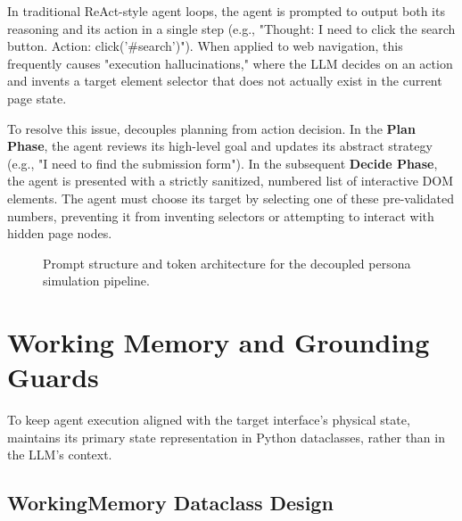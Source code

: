 In traditional ReAct-style agent loops, the agent is prompted to output both its reasoning and its action in a single step (e.g., "Thought: I need to click the search button. Action: click('#search')"). When applied to web navigation, this frequently causes "execution hallucinations," where the LLM decides on an action and invents a target element selector that does not actually exist in the current page state. 

To resolve this issue, \versimux{} decouples planning from action decision. In the \textbf{Plan Phase}, the agent reviews its high-level goal and updates its abstract strategy (e.g., "I need to find the submission form"). In the subsequent \textbf{Decide Phase}, the agent is presented with a strictly sanitized, numbered list of interactive DOM elements. The agent must choose its target by selecting one of these pre-validated numbers, preventing it from inventing selectors or attempting to interact with hidden page nodes.

\begin{figure}[htbp]
  \centering
  \caption{Prompt structure and token architecture for the decoupled persona simulation pipeline.}
  \label{fig:cognitive-prompt-structure}
\end{figure}


\section{Working Memory and Grounding Guards}
\label{sec:grounding-guards}

To keep agent execution aligned with the target interface's physical state, \versimux{} maintains its primary state representation in Python dataclasses, rather than in the LLM's context.

\subsection{WorkingMemory Dataclass Design}
\label{sec:workingmemory-design}

